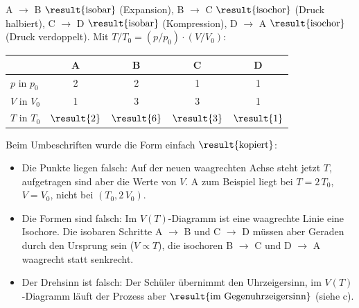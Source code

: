 \begin{abcliste}
\abc A $\to$ B $\result{\text{isobar}}$ (Expansion), B $\to$ C $\result{\text{isochor}}$ (Druck halbiert), C $\to$ D $\result{\text{isobar}}$ (Kompression), D $\to$ A $\result{\text{isochor}}$ (Druck verdoppelt). Mit $T/T_0 = (p/p_0)\cdot(V/V_0)$:
\begin{center}
\begin{tabular}{lcccc}
 & A & B & C & D \\ \hline
 $p$ in $p_0$ & 2 & 2 & 1 & 1 \\
 $V$ in $V_0$ & 1 & 3 & 3 & 1 \\
 $T$ in $T_0$ & $\result{2}$ & $\result{6}$ & $\result{3}$ & $\result{1}$
\end{tabular}
\end{center}

\abc Beim Umbeschriften wurde die Form einfach $\result{\text{kopiert}}$:
\begin{itemize}
\item Die Punkte liegen falsch: Auf der neuen waagrechten Achse steht jetzt $T$, aufgetragen sind aber die Werte von $V$. A zum Beispiel liegt bei $T = 2\,T_0$, $V = V_0$, nicht bei $(T_0, 2\,V_0)$.
\item Die Formen sind falsch: Im $V(T)$-Diagramm ist eine waagrechte Linie eine Isochore. Die isobaren Schritte A $\to$ B und C $\to$ D müssen aber Geraden durch den Ursprung sein ($V \propto T$), die isochoren B $\to$ C und D $\to$ A waagrecht statt senkrecht.
\item Der Drehsinn ist falsch: Der Schüler übernimmt den Uhrzeigersinn, im $V(T)$-Diagramm läuft der Prozess aber $\result{\text{im Gegenuhrzeigersinn}}$ (siehe c).
\end{itemize}


\end{abcliste}
